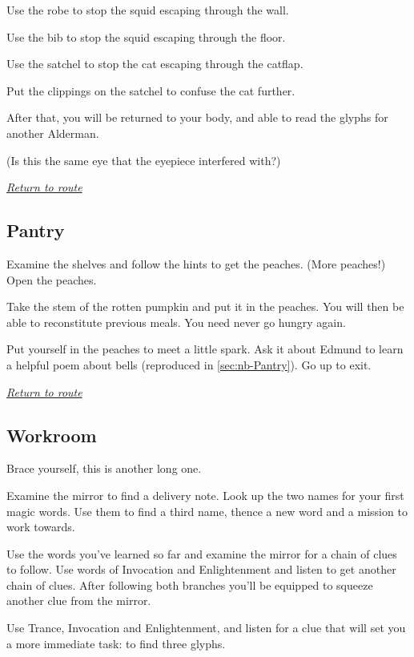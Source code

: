 \documentclass[a5paper]{extarticle}
\begin{document}
Use the robe to stop the squid escaping through the wall.

Use the bib to stop the squid escaping through the floor.

Use the satchel to stop the cat escaping through the catflap.

Put the clippings on the satchel to confuse the cat further.

After that, you will be returned to your body,
and able to read the glyphs for another Alderman.

(Is this the same eye that the eyepiece interfered with?)

\hyperref[sec:route-8]{\emph{Return to route}}

\newpage
\subsection{Pantry}\label{sec:sol-Pantry}

Examine the shelves and follow the hints to get the peaches. (More peaches!)
Open the peaches.

Take the stem of the rotten pumpkin and put it in the peaches.
You will then be able to reconstitute previous meals.
You need never go hungry again.

Put yourself in the peaches to meet a little spark.
Ask it about Edmund to learn a helpful poem about bells
(reproduced in \cref{sec:nb-Pantry}).
Go up to exit.

\hyperref[sec:route-8]{\emph{Return to route}}

\newpage
\subsection{Workroom}\label{sec:sol-Workroom}

Brace yourself, this is another long one.

Examine the mirror to find a delivery note.
Look up the two names for your first magic words.
Use them to find a third name, thence a new word and a mission to work towards.

Use the words you've learned so far and examine the mirror for a chain of clues to follow.
Use words of Invocation and Enlightenment and listen to get another chain of clues.
After following both branches you'll be equipped to squeeze another clue from the mirror.

Use Trance, Invocation and Enlightenment,
and listen for a clue that will set you a more immediate task: to find three glyphs.
\end{document}
